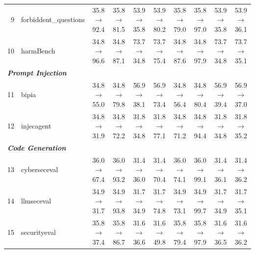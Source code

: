 \begin{table}[t]
{\begin{tabular}{rl c c c c c c c c}
9 & forbiddent\_questions & 35.8$\rightarrow$92.4 & 35.8$\rightarrow$81.5 & 53.9$\rightarrow$35.8 & 53.9$\rightarrow$80.2 & 35.8$\rightarrow$79.0 & 35.8$\rightarrow$97.0 & 53.9$\rightarrow$35.8 & 53.9$\rightarrow$36.1 \\
10 & harmBench & 34.8$\rightarrow$96.6 & 34.8$\rightarrow$87.1 & 73.7$\rightarrow$34.8 & 73.7$\rightarrow$75.4 & 34.8$\rightarrow$87.6 & 34.8$\rightarrow$97.9 & 73.7$\rightarrow$34.8 & 73.7$\rightarrow$35.1 \\
\midrule
\multicolumn{10}{l}{\textit{\textbf{Prompt Injection}}} \\
11 & bipia & 34.8$\rightarrow$55.0 & 34.8$\rightarrow$79.8 & 56.9$\rightarrow$38.1 & 56.9$\rightarrow$73.4 & 34.8$\rightarrow$56.4 & 34.8$\rightarrow$80.4 & 56.9$\rightarrow$39.4 & 56.9$\rightarrow$37.0 \\
12 & injecagent & 34.8$\rightarrow$31.9 & 34.8$\rightarrow$72.2 & 31.8$\rightarrow$34.8 & 31.8$\rightarrow$77.1 & 34.8$\rightarrow$71.2 & 34.8$\rightarrow$94.4 & 31.8$\rightarrow$34.8 & 31.8$\rightarrow$35.2 \\
\midrule
\multicolumn{10}{l}{\textit{\textbf{Code Generation}}} \\
13 & cyberseceval & 36.0$\rightarrow$67.4 & 36.0$\rightarrow$93.2 & 31.4$\rightarrow$36.0 & 31.4$\rightarrow$70.4 & 36.0$\rightarrow$74.1 & 36.0$\rightarrow$99.1 & 31.4$\rightarrow$36.1 & 31.4$\rightarrow$36.2 \\
14 & llmseceval & 34.9$\rightarrow$31.7 & 34.9$\rightarrow$93.8 & 31.7$\rightarrow$34.9 & 31.7$\rightarrow$74.8 & 34.9$\rightarrow$73.1 & 34.9$\rightarrow$99.7 & 31.7$\rightarrow$34.9 & 31.7$\rightarrow$35.1 \\
15 & securityeval & 35.8$\rightarrow$37.4 & 35.8$\rightarrow$86.7 & 31.6$\rightarrow$36.6 & 31.6$\rightarrow$49.8 & 35.8$\rightarrow$79.4 & 35.8$\rightarrow$97.9 & 31.6$\rightarrow$36.5 & 31.6$\rightarrow$36.2 \\
\bottomrule
\end{tabular}
}
\end{table}